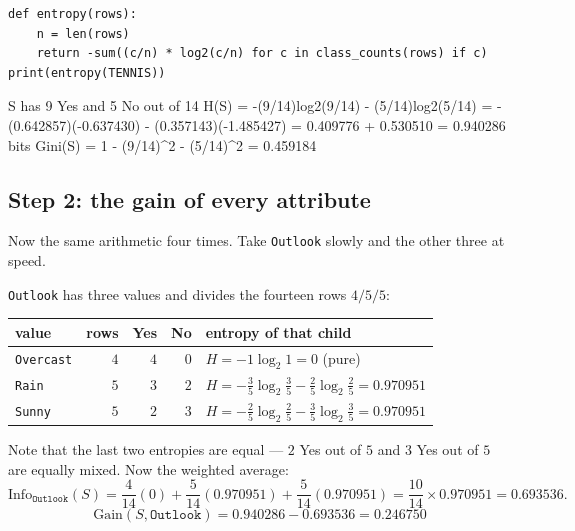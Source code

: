 \documentclass[11pt]{article}
\begin{document}
\begin{lstlisting}
def entropy(rows):
    n = len(rows)
    return -sum((c/n) * log2(c/n) for c in class_counts(rows) if c)
print(entropy(TENNIS))
\end{lstlisting}
\begin{codeout}
S has 9 Yes and 5 No out of 14
H(S) = -(9/14)log2(9/14) - (5/14)log2(5/14)
     = -(0.642857)(-0.637430) - (0.357143)(-1.485427)
     = 0.409776 + 0.530510 = 0.940286 bits
Gini(S) = 1 - (9/14)^2 - (5/14)^2 = 0.459184
\end{codeout}

\subsection{Step 2: the gain of every attribute}

Now the same arithmetic four times. Take \texttt{Outlook} slowly and the other
three at speed.

\begin{worked}
\texttt{Outlook} has three values and divides the fourteen rows $4/5/5$:
\begin{center}
\begin{tabular}{@{}lrrrl@{}}
\toprule
value & rows & Yes & No & entropy of that child\\
\midrule
\texttt{Overcast} & $4$ & $4$ & $0$ &
  $H = -1\log_2 1 = 0$ \quad (pure)\\
\texttt{Rain}     & $5$ & $3$ & $2$ &
  $H = -\tfrac35\log_2\tfrac35 - \tfrac25\log_2\tfrac25 = 0.970951$\\
\texttt{Sunny}    & $5$ & $2$ & $3$ &
  $H = -\tfrac25\log_2\tfrac25 - \tfrac35\log_2\tfrac35 = 0.970951$\\
\bottomrule
\end{tabular}
\end{center}
Note that the last two entropies are equal --- $2$ Yes out of $5$ and $3$ Yes
out of $5$ are equally mixed. Now the weighted average:
\[
  \mathrm{Info}_{\texttt{Outlook}}(S)
   = \frac{4}{14}(0) + \frac{5}{14}(0.970951) + \frac{5}{14}(0.970951)
   = \frac{10}{14} \times 0.970951 = 0.693536 .
\]
\[
  \boxed{\ \mathrm{Gain}(S, \texttt{Outlook}) = 0.940286 - 0.693536
   = \mathbf{0.246750}\ }
\]
\end{worked}
\end{document}
